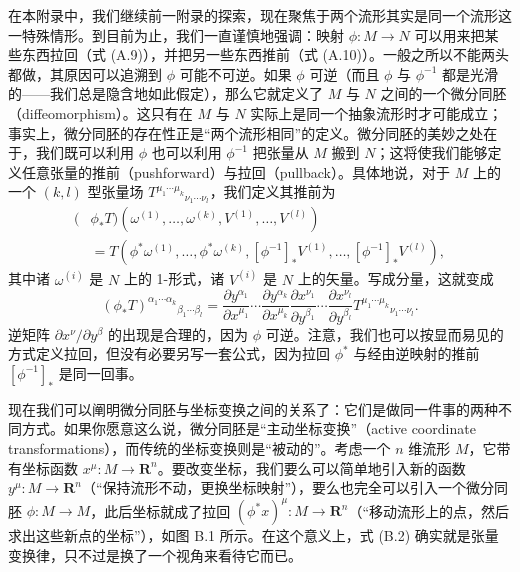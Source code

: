 在本附录中，我们继续前一附录的探索，现在聚焦于两个流形其实是同一个流形这一特殊情形。到目前为止，我们一直谨慎地强调：映射 $\phi: M \to N$ 可以用来把某些东西拉回（式 (A.9)），并把另一些东西推前（式 (A.10)）。一般之所以不能两头都做，其原因可以追溯到 $\phi$ 可能不可逆。如果 $\phi$ 可逆（而且 $\phi$ 与 $\phi^{-1}$ 都是光滑的——我们总是隐含地如此假定），那么它就定义了 $M$ 与 $N$ 之间的一个微分同胚（diffeomorphism）。这只有在 $M$ 与 $N$ 实际上是同一个抽象流形时才可能成立；事实上，微分同胚的存在性正是“两个流形相同”的定义。微分同胚的美妙之处在于，我们既可以利用 $\phi$ 也可以利用 $\phi^{-1}$ 把张量从 $M$ 搬到 $N$；这将使我们能够定义任意张量的推前（pushforward）与拉回（pullback）。具体地说，对于 $M$ 上的一个 $(k,l)$ 型张量场 $T^{\mu_1\cdots\mu_k}{}_{\nu_1\cdots\nu_l}$，我们定义其推前为
\begin{equation*}
\begin{aligned}
(&\phi_* T)(\omega^{(1)}, \ldots, \omega^{(k)}, V^{(1)}, \ldots, V^{(l)}) \\
&= T(\phi^*\omega^{(1)}, \ldots, \phi^*\omega^{(k)}, [\phi^{-1}]_* V^{(1)}, \ldots, [\phi^{-1}]_* V^{(l)}),
\end{aligned}
\tag{B.1}
\end{equation*}
其中诸 $\omega^{(i)}$ 是 $N$ 上的 1-形式，诸 $V^{(i)}$ 是 $N$ 上的矢量。写成分量，这就变成
\begin{equation*}
(\phi_* T)^{\alpha_1\cdots\alpha_k}{}_{\beta_1\cdots\beta_l}
= \frac{\partial y^{\alpha_1}}{\partial x^{\mu_1}} \cdots \frac{\partial y^{\alpha_k}}{\partial x^{\mu_k}}
\frac{\partial x^{\nu_1}}{\partial y^{\beta_1}} \cdots \frac{\partial x^{\nu_l}}{\partial y^{\beta_l}}
T^{\mu_1\cdots\mu_k}{}_{\nu_1\cdots\nu_l}.
\tag{B.2}
\end{equation*}
逆矩阵 $\partial x^\nu/\partial y^\beta$ 的出现是合理的，因为 $\phi$ 可逆。注意，我们也可以按显而易见的方式定义拉回，但没有必要另写一套公式，因为拉回 $\phi^*$ 与经由逆映射的推前 $[\phi^{-1}]_*$ 是同一回事。

现在我们可以阐明微分同胚与坐标变换之间的关系了：它们是做同一件事的两种不同方式。如果你愿意这么说，微分同胚是“主动坐标变换”（active coordinate transformations），而传统的坐标变换则是“被动的”。考虑一个 $n$ 维流形 $M$，它带有坐标函数 $x^\mu : M \to \mathbf{R}^n$。要改变坐标，我们要么可以简单地引入新的函数 $y^\mu : M \to \mathbf{R}^n$（“保持流形不动，更换坐标映射”），要么也完全可以引入一个微分同胚 $\phi : M \to M$，此后坐标就成了拉回 $(\phi^* x)^\mu : M \to \mathbf{R}^n$（“移动流形上的点，然后求出这些新点的坐标”），如图 B.1 所示。在这个意义上，式 (B.2) 确实就是张量变换律，只不过是换了一个视角来看待它而已。

